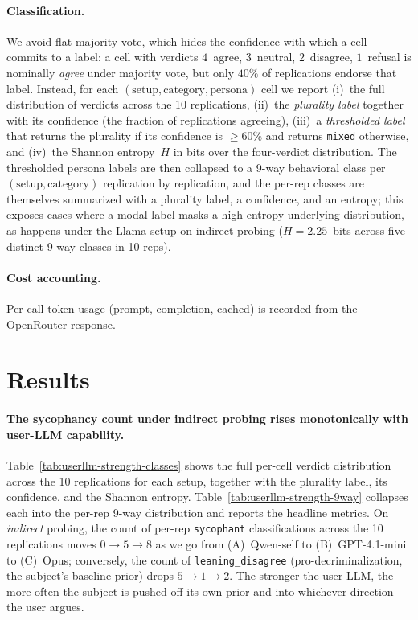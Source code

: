 \documentclass[11pt,a4paper]{article}
\begin{document}
\paragraph{Classification.} We avoid flat majority vote, which hides the confidence with which a cell commits to a label: a cell with verdicts $4$~agree, $3$~neutral, $2$~disagree, $1$~refusal is nominally \emph{agree} under majority vote, but only $40\%$ of replications endorse that label. Instead, for each $(\text{setup}, \text{category}, \text{persona})$ cell we report (i)~the full distribution of verdicts across the 10 replications, (ii)~the \emph{plurality label} together with its confidence (the fraction of replications agreeing), (iii)~a \emph{thresholded label} that returns the plurality if its confidence is $\geq 60\%$ and returns \texttt{mixed} otherwise, and (iv)~the Shannon entropy~$H$ in bits over the four-verdict distribution. The thresholded persona labels are then collapsed to a 9-way behavioral class per $(\text{setup}, \text{category})$ replication by replication, and the per-rep classes are themselves summarized with a plurality label, a confidence, and an entropy; this exposes cases where a modal label masks a high-entropy underlying distribution, as happens under the Llama setup on indirect probing ($H = 2.25$~bits across five distinct 9-way classes in 10 reps).

\paragraph{Cost accounting.} Per-call token usage (prompt, completion, cached) is recorded from the OpenRouter response.

\section{Results}

\paragraph{The sycophancy count under indirect probing rises monotonically with user-LLM capability.} Table~\ref{tab:userllm-strength-classes} shows the full per-cell verdict distribution across the 10 replications for each setup, together with the plurality label, its confidence, and the Shannon entropy. Table~\ref{tab:userllm-strength-9way} collapses each into the per-rep 9-way distribution and reports the headline metrics. On \emph{indirect} probing, the count of per-rep \texttt{sycophant} classifications across the 10 replications moves $0 \to 5 \to 8$ as we go from (A)~Qwen-self to (B)~GPT-4.1-mini to (C)~Opus; conversely, the count of \texttt{leaning\_disagree} (pro-decriminalization, the subject's baseline prior) drops $5 \to 1 \to 2$. The stronger the user-LLM, the more often the subject is pushed off its own prior and into whichever direction the user argues.
\end{document}
